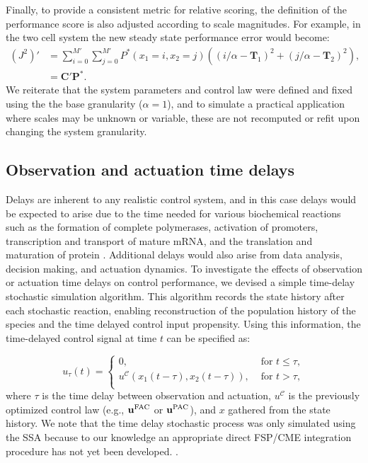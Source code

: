 \documentclass[12pt]{iopart}
\begin{document}
Finally, to provide a consistent metric for relative scoring, the definition of the performance score is also adjusted according to scale magnitudes. For example, in the two cell system the new steady state performance error would become:
\begin{eqnarray}
(J^2)' &= \sum_{i=0}^{M'}  \sum_{j=0}^{M'}P^*(x_1=i,x_2=j) ((i/\alpha - \mathbf T_1)^2 + (j/\alpha -\mathbf T_2)^2),\nonumber \\
& =\mathbf{C}'\mathbf{P}^*.
\label{EuclidV}
\end{eqnarray}
We reiterate that the system parameters and control law were defined and fixed using the the base granularity ($\alpha=1$), and to simulate a practical application where scales may be unknown or variable, these are not recomputed or refit upon changing the system granularity.

\subsection{Observation and actuation time delays}\label{sec:Delay}

Delays are inherent to any realistic control system, and in this case delays would be expected to arise due to the time needed for various biochemical reactions such as the formation of complete polymerases, activation of promoters, transcription and transport of mature mRNA, and the translation and maturation of protein \cite{Cai2007}. 
Additional delays would also arise from data analysis, decision making, and actuation dynamics. 
To investigate the effects of observation or actuation time delays on control performance, we devised a simple time-delay stochastic simulation algorithm. 
This algorithm records the state history after each stochastic reaction, enabling reconstruction of the population history of the species and the time delayed control input propensity.  
Using this information, the time-delayed control signal at time $t$ can be specified as: 

\begin{equation}
u_{\tau}(t)=\left\{
\begin{array}{rl}
      0 ,&\textrm{ for }  t \leq \tau, \\
      {u}^{\mathcal{C}}(x_1(t-\tau), x_2(t-\tau)) , &\textrm{ for }   t > \tau,\\
\end{array}\right. 
\label{timeDelaySSA}
\end{equation}
where $\tau$ is the time delay between observation and actuation, ${u}^{\mathcal{C}}$ is the previously optimized control law (e.g., $\mathbf{u}^{\rm FAC}$ or $\mathbf{u}^{\rm PAC}$), and $x$ gathered from the state history. 
We note that the time delay stochastic process was only simulated using the SSA because to our knowledge an appropriate direct FSP/CME integration procedure has not yet been developed.
\brian[Still missing reference to the extrande method at this website
\url{https://journals.plos.org/ploscompbiol/article?id=10.1371/journal.pcbi.1004923}].
\end{document}

